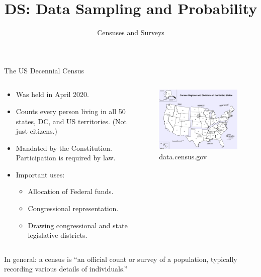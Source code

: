 \documentclass[aspectratio=169]{../latex_main/tntbeamer}  %
\title[Introduction]{DS: Data Sampling and Probability}
\subtitle{Censuses and Surveys}
\begin{document}
	
	\maketitle
	
	\begin{frame}{The US Decennial Census}

          \vspace*{-1em}
	     \begin{columns}
	         \begin{column}{.4\textwidth}
	         \begin{itemize}
	             \item Was held in April 2020.
	             \item Counts every person living in all 50 states, DC, and US territories. (Not just citizens.)
	             \item Mandated by the Constitution. Participation is required by law.
	             \item Important uses:
	             \begin{itemize}
	                 \item Allocation of Federal funds.
	                 \item Congressional representation.
	                 \item Drawing congressional and state legislative districts.
	             \end{itemize}
	         \end{itemize}
	         

	         \end{column}
	         \begin{column}{.4\textwidth}
	                \begin{figure}
	                    \centering
	                    \includegraphics[scale=.7]{Bild6}
	                    \caption{data.census.gov}
	                \end{figure}
	                

	         \end{column}
	         
	         
	         
	     \end{columns}
	     In general: \alert{a census is “an official count or survey of a population, typically recording various details of individuals.”}
	\end{frame}
	
\end{document}
